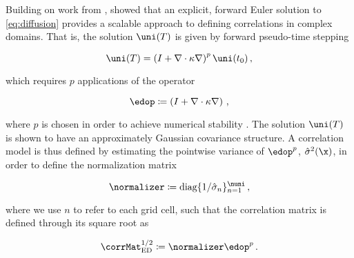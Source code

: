 \documentclass[alpha-refs]{wiley-article}
\begin{document}
Building on work from \citet{derber_global_1989, egbert_topexposeidon_1994,
bennett_generalized_1996},
\citet{weaver_correlation_2001} showed that an explicit, forward Euler solution to
\cref{eq:diffusion} provides a scalable approach to defining correlations in
complex domains.
That is, the solution $\uni(T)$ is given by forward pseudo-time stepping
\begin{linenomath*}\begin{equation}
    \uni(T) = \left( I + \nabla\cdot\kappa\nabla\right)^p \uni(t_0) \, ,
    \label{eq:wc01_diffusion}
\end{equation}\end{linenomath*}
which requires $p$ applications of the operator
\begin{linenomath*}\begin{equation*}
    \edop \coloneqq \left(I+\nabla\cdot\kappa\nabla\right) \, ,
\end{equation*}\end{linenomath*}
where $p$ is chosen in
order to achieve numerical stability \citep[see][for details regarding the
discretized form of this operator, and extensions of the model briefly shown
here]{weaver_correlation_2001}.
The solution $\uni(T)$ is shown to have an approximately Gaussian covariance
structure.
A correlation model is thus defined by estimating the pointwise
variance of $\edop^{p}$, $\hat{\sigma}^2(\x)$, in order to define the normalization
matrix
\begin{linenomath*}\begin{equation*}
    \normalizer \coloneqq \text{diag}\{1/\hat{\sigma}_n\}_{n=1}^{\nuni} \, ,
\end{equation*}\end{linenomath*}
where we use $n$ to refer to each grid cell, such that the correlation matrix is
defined through its square root as
\begin{linenomath*}\begin{equation}
    \corrMat^{1/2}_\text{ED} \coloneqq \normalizer \edop^{p} \, .
\end{equation}\end{linenomath*}
\end{document}
